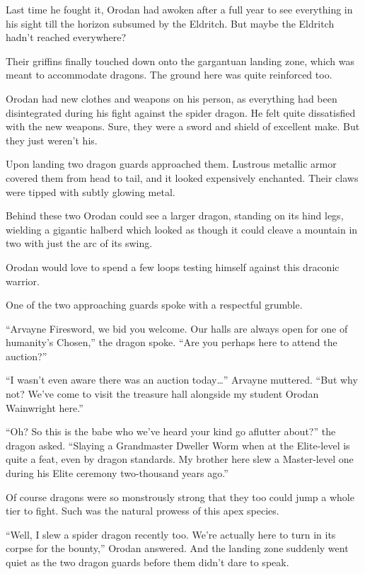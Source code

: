\documentclass[a4paper,10pt]{book}
\begin{document}
Last time he fought it, Orodan had awoken after a full year to see everything in his sight till the horizon subsumed by the Eldritch. But maybe the Eldritch hadn’t reached everywhere?\par
Their griffins finally touched down onto the gargantuan landing zone, which was meant to accommodate dragons. The ground here was quite reinforced too.\par
Orodan had new clothes and weapons on his person, as everything had been disintegrated during his fight against the spider dragon. He felt quite dissatisfied with the new weapons. Sure, they were a sword and shield of excellent make. But they just weren’t his.\par
Upon landing two dragon guards approached them. Lustrous metallic armor covered them from head to tail, and it looked expensively enchanted. Their claws were tipped with subtly glowing metal.\par
Behind these two Orodan could see a larger dragon, standing on its hind legs, wielding a gigantic halberd which looked as though it could cleave a mountain in two with just the arc of its swing.\par
Orodan would love to spend a few loops testing himself against this draconic warrior.\par
One of the two approaching guards spoke with a respectful grumble.\par
“Arvayne Firesword, we bid you welcome. Our halls are always open for one of humanity’s Chosen,” the dragon spoke. “Are you perhaps here to attend the auction?”\par
“I wasn’t even aware there was an auction today…” Arvayne muttered. “But why not? We’ve come to visit the treasure hall alongside my student Orodan Wainwright here.”\par
“Oh? So this is the babe who we’ve heard your kind go aflutter about?” the dragon asked. “Slaying a Grandmaster Dweller Worm when at the Elite-level is quite a feat, even by dragon standards. My brother here slew a Master-level one during his Elite ceremony two-thousand years ago.”\par
Of course dragons were so monstrously strong that they too could jump a whole tier to fight. Such was the natural prowess of this apex species.\par
“Well, I slew a spider dragon recently too. We’re actually here to turn in its corpse for the bounty,” Orodan answered. And the landing zone suddenly went quiet as the two dragon guards before them didn’t dare to speak.\par
\end{document}
